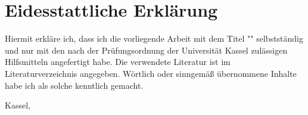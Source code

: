 \chapter*{Eidesstattliche Erklärung}


Hiermit erkläre ich, dass ich die vorliegende Arbeit mit dem Titel "\thesistitle" selbstständig 
und nur mit den nach der Prüfungsordnung der Universität Kassel zulässigen Hilfsmitteln angefertigt habe.
Die verwendete Literatur ist im Literaturverzeichnis angegeben.
Wörtlich oder sinngemäß übernommene Inhalte habe ich als solche kenntlich gemacht.

\vspace{1cm}

Kassel, \thesisdate

\begin{flushright}
  \underline{\hspace{7cm}} \\
  \thesisauthorname
\end{flushright}

